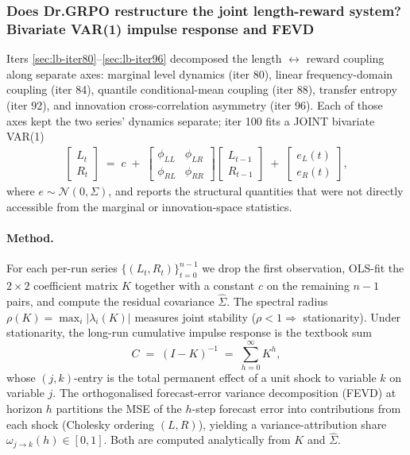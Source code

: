 \subsubsection{Does Dr.GRPO restructure the joint length-reward system?
Bivariate VAR(1) impulse response and FEVD}\label{sec:lb-iter100}

Iters \ref{sec:lb-iter80}--\ref{sec:lb-iter96} decomposed the length
$\leftrightarrow$ reward coupling along separate axes: marginal level
dynamics (iter 80), linear frequency-domain coupling (iter 84),
quantile conditional-mean coupling (iter 88), transfer entropy (iter 92),
and innovation cross-correlation asymmetry (iter 96).  Each of those
axes kept the two series' dynamics separate; iter 100 fits a JOINT
bivariate VAR(1)
\begin{align}\label{eq:lb-iter100-var}
  \begin{bmatrix} L_t \\ R_t \end{bmatrix}
  \;=\; c \;+\; \begin{bmatrix} \phi_{LL} & \phi_{LR} \\ \phi_{RL} & \phi_{RR} \end{bmatrix}
  \begin{bmatrix} L_{t-1} \\ R_{t-1} \end{bmatrix}
  \;+\; \begin{bmatrix} e_L(t) \\ e_R(t) \end{bmatrix},
\end{align}
where $e \!\sim\! \mathcal{N}(0, \Sigma)$, and reports the structural
quantities that were not directly accessible from the marginal or
innovation-space statistics.

\paragraph{Method.}  For each per-run series $\{(L_t, R_t)\}_{t=0}^{n-1}$
we drop the first observation, OLS-fit the $2\times 2$ coefficient
matrix $K$ together with a constant $c$ on the remaining $n-1$ pairs,
and compute the residual covariance $\widehat\Sigma$.  The spectral
radius $\rho(K) = \max_i |\lambda_i(K)|$ measures joint stability
($\rho < 1 \Rightarrow$ stationarity).  Under stationarity, the
long-run cumulative impulse response is the textbook sum
\begin{equation}\label{eq:lb-iter100-cum}
  C \;=\; (I - K)^{-1} \;=\; \sum_{h=0}^{\infty} K^h,
\end{equation}
whose $(j,k)$-entry is the total permanent effect of a unit shock to
variable $k$ on variable $j$.  The orthogonalised forecast-error
variance decomposition (FEVD) at horizon $h$ partitions the MSE of the
$h$-step forecast error into contributions from each shock (Cholesky
ordering $(L,R)$), yielding a variance-attribution share
$\omega_{j\to k}(h) \in [0,1]$.  Both are computed analytically from
$K$ and $\widehat\Sigma$.

